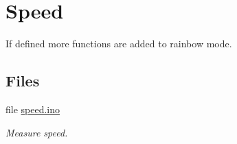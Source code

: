 \hypertarget{group__speed}{}\section{Speed}
\label{group__speed}


If defined more functions are added to rainbow mode.  


\subsection*{Files}
\begin{DoxyCompactItemize}
\item 
file \hyperlink{speed_8ino}{speed.\+ino}
\begin{DoxyCompactList}\small\item\em Measure speed. \end{DoxyCompactList}\end{DoxyCompactItemize}
